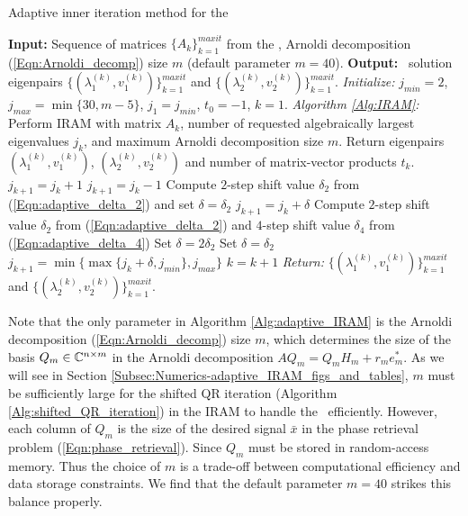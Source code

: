 \begin{algorithm}[H]
\caption{Adaptive inner iteration method for the \emep}	\label{Alg:adaptive_IRAM}

\begin{algorithmic}[1]
	\Statex 	\textbf{Input:} Sequence of matrices $\{ A_k \}_{k=1}^{maxit}$ from the \emep, Arnoldi decomposition (\ref{Eqn:Arnoldi_decomp})  size $m$ (default parameter $m = 40$).
	\Statex 	\textbf{Output:} \emep \ solution eigenpairs $\{ (\lambda_1^{(k)}, v_1^{(k)}) \}_{k=1}^{maxit}$ and  $\{ (\lambda_2^{(k)}, v_2^{(k)}) \}_{k=1}^{maxit}$.
	\State		\textit{Initialize:} $j_{min}=2$, $j_{max} = \min\{ 30, m-5 \}$, $j_1=j_{min}$, $t_0=-1$, $k=1$.
		\State		\textit{Algorithm \ref{Alg:IRAM}:} Perform IRAM with matrix $A_k$, number of requested algebraically largest eigenvalues $j_k$, and maximum Arnoldi decomposition size $m$.  Return eigenpairs $(\lambda_1^{(k)}, v_1^{(k)} )$, $(\lambda_2^{(k)}, v_2^{(k)} )$ and number of matrix-vector products $t_k$.
			\State 		$j_{k+1} = j_k + 1$
			\State		$j_{k+1} = j_k - 1$
			\State		Compute $2$-step shift value $\delta_2$ from (\ref{Eqn:adaptive_delta_2}) and set $\delta = \delta_2$
			\State		$j_{k+1} = j_k + \delta$
		\Else
			\State 		Compute $2$-step shift value $\delta_2$ from (\ref{Eqn:adaptive_delta_2}) and $4$-step shift value $\delta_4$ from (\ref{Eqn:adaptive_delta_4})
				\State		Set $\delta = 2\delta_2$
			\Else
				\State 			Set $\delta = \delta_2$
			\EndIf
			\State		$j_{k+1} =\min \{ \max \{ j_k + \delta, j_{min} \}, j_{max} \}$
		\EndIf
		\State		$k = k+1$
	\EndWhile
	\State		\textit{Return:} $\{ (\lambda_1^{(k)}, v_1^{(k)}) \}_{k=1}^{maxit}$ and  $\{ (\lambda_2^{(k)}, v_2^{(k)}) \}_{k=1}^{maxit}$.
\end{algorithmic}

\end{algorithm}



Note that the only parameter in Algorithm \ref{Alg:adaptive_IRAM} is the Arnoldi decomposition (\ref{Eqn:Arnoldi_decomp}) size $m$, which determines the size of the basis $Q_m \in {\mathbb C}^{n \times m}$ in the Arnoldi decomposition $AQ_m = Q_mH_m + r_me_m^*$.  As we will see in Section \ref{Subsec:Numerics-adaptive_IRAM_figs_and_tables}, $m$ must be sufficiently large for the shifted QR iteration (Algorithm \ref{Alg:shifted_QR_iteration}) in the IRAM to handle the \emep \ efficiently.  However,  each column of $Q_m$ is the size of the desired signal $\bar{x}$ in the phase retrieval problem (\ref{Eqn:phase_retrieval}).  Since $Q_m$ must be stored in random-access memory.  Thus the choice of $m$ is a trade-off between computational efficiency and data storage constraints.  We find that the default parameter $m=40$ strikes this balance properly.










